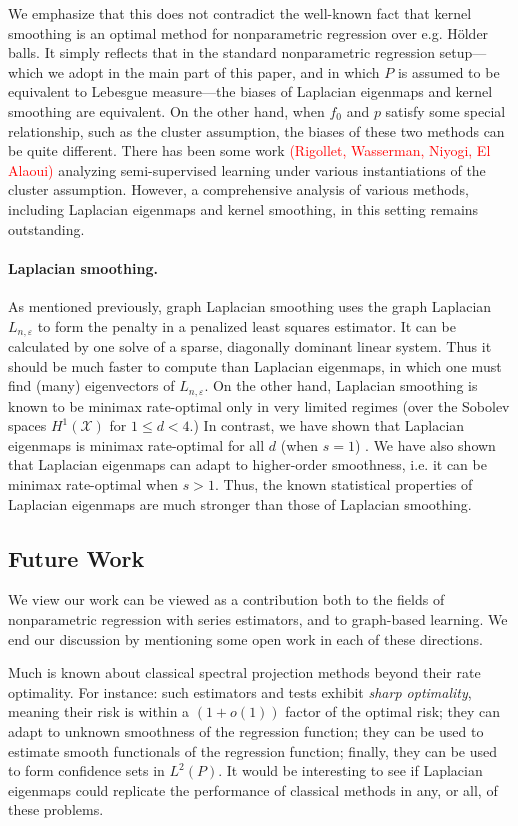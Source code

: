\documentclass{article}
\newcommand{\1}{\mathbf{1}}
\newcommand{\mc}[1]{\mathcal{#1}}
\theoremstyle{alden}
\theoremstyle{aldenthm}
\theoremstyle{definition}
\theoremstyle{remark}
\begin{document}
We emphasize that this does not contradict the well-known fact that kernel smoothing is an optimal method for nonparametric regression over e.g. H\"{o}lder balls. It simply reflects that in the standard nonparametric regression setup---which we adopt in the main part of this paper, and in which $P$ is assumed to be equivalent to Lebesgue measure---the biases of Laplacian eigenmaps and kernel smoothing are equivalent. On the other hand, when $f_0$ and $p$ satisfy some special relationship, such as the cluster assumption, the biases of these two methods can be quite different. There has been some work \textcolor{red}{(Rigollet, Wasserman, Niyogi, El Alaoui)} analyzing semi-supervised learning under various instantiations of the cluster assumption. However, a comprehensive analysis of various methods, including Laplacian eigenmaps and kernel smoothing, in this setting remains outstanding.

\paragraph{Laplacian smoothing.}
As mentioned previously, graph Laplacian smoothing uses the graph Laplacian $L_{n,\varepsilon}$ to form the penalty in a penalized least squares estimator. It can be calculated by one solve of a sparse, diagonally dominant linear system. Thus it should be much faster to compute than Laplacian eigenmaps, in which one must find (many) eigenvectors of $L_{n,\varepsilon}$. On the other hand, Laplacian smoothing is known to be minimax rate-optimal only in very limited regimes (over the Sobolev spaces $H^1(\mc{X})$ for $1 \leq d < 4$.) In contrast, we have shown that Laplacian eigenmaps is minimax rate-optimal for all $d$ (when $s = 1$) . We have also shown that Laplacian eigenmaps can adapt to higher-order smoothness, i.e. it can be minimax rate-optimal when $s > 1$. Thus, the known statistical properties of Laplacian eigenmaps are much stronger than those of Laplacian smoothing. 

\subsection{Future Work}
We view our work can be viewed as a contribution both to the fields of nonparametric regression with series estimators, and to graph-based learning. We end our discussion by mentioning some open work in each of these directions. 

Much is known about classical spectral projection methods beyond their rate optimality. For instance: such estimators and tests exhibit \emph{sharp optimality}, meaning their risk is within a $(1 + o(1))$ factor of the optimal risk; they can adapt to unknown smoothness of the regression function; they can be used to estimate smooth functionals of the regression function;  finally, they can be used to form confidence sets in $L^2(P)$. It would be interesting to see if Laplacian eigenmaps could replicate the performance of classical methods in any, or all, of these problems.
\end{document}
